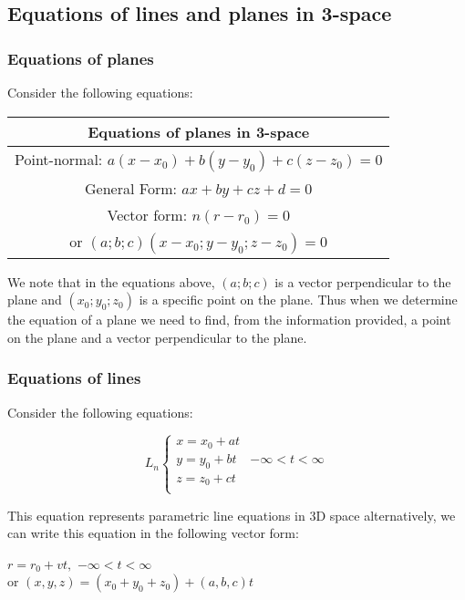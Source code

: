 \subsection{Equations of lines and planes in 3-space}

\subsubsection{Equations of planes}

Consider the following equations:

\begin{center}
    \begin{tabular}{ | c | }
        \hline
        \textbf{Equations of planes in 3-space}             \\ \hline
        Point-normal: $a(x-x_0) + b (y-y_0) + c(z-z_0) = 0$ \\ \hline
        General Form: $ax + by + cz + d = 0$                \\ \hline
        Vector form: $n(r-r_0) = 0$                         \\
        or $(a; b; c)(x-x_0; y-y_0; z-z_0) = 0$             \\ \hline
    \end{tabular}
\end{center}

We note that in the equations above, $(a; b; c)$ is a vector perpendicular to the plane and $(x_0; y_0; z_0)$ is a
specific point on the plane.
Thus when we determine the equation of a plane we need to find, from the information
provided, a point on the plane and a vector perpendicular to the plane.

\subsubsection{Equations of lines}

Consider the following equations:

\[ L_n
\begin{cases} 
x = x_0 + at \\ 
y = y_0 + bt & -\infty < t < \infty \\ 
z = z_0 + ct \\
\end{cases} 
\]

This equation represents parametric line equations in 3D space alternatively, we can write this equation in the following vector form:

\begin{center}
$r = r_0 + vt ,$ $ -\infty < t < \infty$ \\
or $(x,y,z) = (x_0+y_0+z_0)+(a,b,c)t$ 
\end{center}


